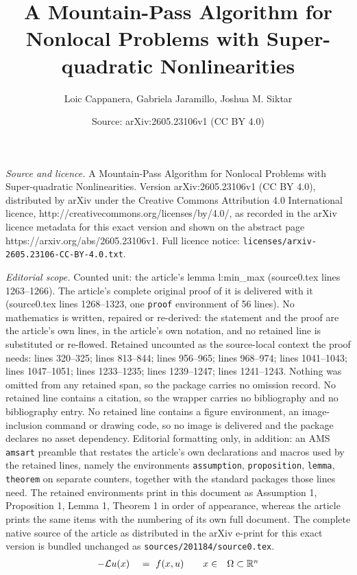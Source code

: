 \documentclass[10pt,a4paper]{amsart}
\title{A Mountain-Pass Algorithm for Nonlocal Problems with Super-quadratic Nonlinearities}
\author{Loic Cappanera, Gabriela Jaramillo, Joshua M. Siktar}
\date{Source: arXiv:2605.23106v1 (CC BY 4.0)}
\begin{document}
\maketitle

\noindent\emph{Source and licence.} A Mountain-Pass Algorithm for Nonlocal Problems with Super-quadratic Nonlinearities. Version arXiv:2605.23106v1 (CC BY 4.0), distributed by arXiv under the Creative Commons Attribution 4.0 International licence, http://creativecommons.org/licenses/by/4.0/, as recorded in the arXiv licence metadata for this exact version and shown on the abstract page https://arxiv.org/abs/2605.23106v1. Full licence notice: \texttt{licenses/arxiv-2605.23106-CC-BY-4.0.txt}.\par\smallskip

\noindent\textit{Editorial scope.} Counted unit: the article's lemma l:min\_max (source0.tex lines 1263--1266). The article's complete original proof of it is delivered with it (source0.tex lines 1268--1323, one \texttt{proof} environment of 56 lines). No mathematics is written, repaired or re-derived: the statement and the proof are the article's own lines, in the article's own notation, and no retained line is substituted or re-flowed.  Retained uncounted as the source-local context the proof needs: lines 320--325; lines 813--844; lines 956--965; lines 968--974; lines 1041--1043; lines 1047--1051; lines 1233--1235; lines 1239--1247; lines 1241--1243.  Nothing was omitted from any retained span, so the package carries no omission record.  No retained line contains a citation, so the wrapper carries no bibliography and no bibliography entry.  No retained line contains a figure environment, an image-inclusion command or drawing code, so no image is delivered and the package declares no asset dependency.  Editorial formatting only, in addition: an AMS \texttt{amsart} preamble that restates the article's own declarations and macros used by the retained lines, namely the environments \texttt{assumption}, \texttt{proposition}, \texttt{lemma}, \texttt{theorem} on separate counters, together with the standard packages those lines need.  The retained environments print in this document as Assumption 1, Proposition 1, Lemma 1, Theorem 1 in order of appearance, whereas the article prints the same items with the numbering of its own full document.  The complete native source of the article as distributed in the arXiv e-print for this exact version is bundled unchanged as \texttt{sources/201184/source0.tex}.
\begin{equation}\label{e:nonlocal_eq}
\begin{array}{c c c c }
-\mathcal{L} u(x) \ & = \ f(x,u) & \quad  x \in & \Omega \subset \mathbb{R}^n \\ %
\end{array}
\end{equation}
\end{document}
